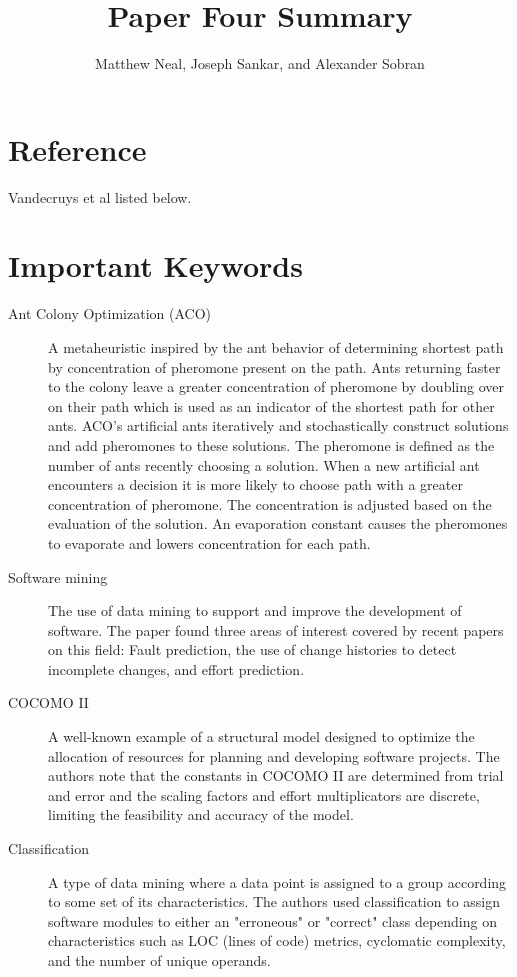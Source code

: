 \documentclass[english]{article}
\begin{document}
\title{Paper Four Summary}


\author{Matthew Neal, Joseph Sankar, and Alexander Sobran}

\maketitle

\section*{Reference}

Vandecruys et al \cite{Vandecruys08} listed below.


\section*{Important Keywords}
\begin{description}
\item [{Ant Colony Optimization (ACO)}] A metaheuristic inspired by the ant behavior of determining shortest path by concentration of pheromone present on the path. Ants returning faster to the colony leave a greater concentration of pheromone by doubling over on their path which is used as an indicator of the shortest path for other ants. ACO's artificial ants iteratively and stochastically construct solutions and add pheromones to these solutions. The pheromone is defined as the number of ants recently choosing a solution. When a new artificial ant encounters a decision it is more likely to choose path with a greater concentration of pheromone. The concentration is adjusted based on the evaluation of the solution. An evaporation constant causes the pheromones to evaporate and lowers concentration for each path.
\item [{Software mining}] The use of data mining to support and improve the development of software. The paper found three areas of interest covered by recent papers on this field: Fault prediction, the use of change histories to detect incomplete changes, and effort prediction.
\item[{COCOMO II}] A well-known example of a structural model designed to optimize the allocation of resources for planning and developing software projects. The authors note that the constants in COCOMO II are determined from trial and error and the scaling factors and effort multiplicators are discrete, limiting the feasibility and accuracy of the model.
\item[{Classification}] A type of data mining where a data point is assigned to a group according to some set of its characteristics. The authors used classification to assign software modules to either an "erroneous" or "correct" class depending on characteristics such as LOC (lines of code) metrics, cyclomatic complexity, and the number of unique operands.
\end{description}
\end{document}
